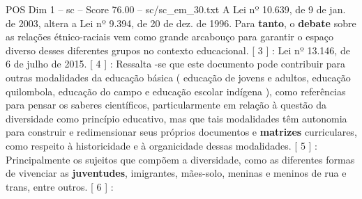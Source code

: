 \begin{textsample}{POS Dim 1 – sc – Score 76.00 – sc/sc\_em\_30.txt}
A Lei nº 10.639, de 9 de jan. de 2003, altera a Lei nº 9.394, de 20 de dez. de 1996.
Para \textbf{tanto}, o \textbf{debate} sobre as relações étnico-raciais vem como grande arcabouço para garantir o espaço diverso desses diferentes grupos no contexto educacional. [ 3 ] : Lei nº 13.146, de 6 de julho de 2015. [ 4 ] : Ressalta -se que este documento pode contribuir para outras modalidades da educação básica ( educação de jovens e adultos, educação quilombola, educação do campo e educação escolar indígena ), como referências para pensar os saberes científicos, particularmente em relação à questão da diversidade como princípio educativo, mas que tais modalidades têm autonomia para construir e redimensionar seus próprios documentos e \textbf{matrizes} curriculares, como respeito à historicidade e à organicidade dessas modalidades. [ 5 ] : Principalmente os sujeitos que compõem a diversidade, como as diferentes formas de vivenciar as \textbf{juventudes}, imigrantes, mães-solo, meninas e meninos de rua e trans, entre outros. [ 6 ] :

\end{textsample}
